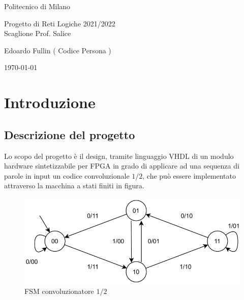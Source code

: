 \documentclass[12pt, a4paper]{article}
\begin{document}
\begin{titlepage}
    \centering

    \vspace{0.5cm} {
        \large Politecnico di Milano\\
    }

    \vspace{5cm} {
        \huge {
            Progetto di Reti Logiche 2021/2022\\
        }
        \vspace{0.5cm}
        \large {Scaglione Prof. Salice}
    }

    \vspace{2cm} {
        \large
        Edoardo Fullin ( Codice Persona )
    }

    \vspace*{\fill}
    \today

\end{titlepage}

\tableofcontents

\pagebreak

\section{Introduzione}

\subsection{Descrizione del progetto}

Lo scopo del progetto è il design, tramite linguaggio VHDL di un modulo hardware sintetizzabile per FPGA
in grado di applicare ad una sequenza di parole in input un codice convoluzionale $1/2$, che 
può essere implementato attraverso la macchina a stati finiti in figura.


\begin{figure}[!ht]
    \centering
    \includegraphics[scale=0.7]{convoluzionatore_1_2_fsm.png}
    \caption{FSM convoluzionatore $1/2$}
    \label{fig:fsm_conv}
\end{figure}
\end{document}
